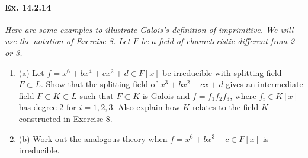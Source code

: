 \documentclass[11pt,a4paper]{article}
\newcommand{\be} {\begin{enumerate}}
\newcommand{\ee} {\end{enumerate}}
\begin{document}
\paragraph{Ex. 14.2.14} {\it Here are some examples to illustrate Galois's definition of imprimitive. We will use the notation of Exercise 8. Let $F$ be a field of characteristic different from 2 or 3.
\be
\item[(a)] Let $f = x^6 + bx^4+cx^2 +d \in F[x]$ be irreducible with splitting field $F \subset L$. Show that the splitting field of $x^3+bx^2+cx+d$ gives an intermediate field $F\subset K \subset L$ such that $F \subset K$ is Galois and $f=f_1f_2f_3$, where $f_i \in K[x]$ has degree 2 for $i=1,2,3$. Also explain how $K$ relates to the field $K$ constructed in Exercise 8.
\item[(b)] Work out the analogous theory when $f = x^6 + bx^3+c \in F[x]$ is irreducible.
\ee
}
\end{document}
